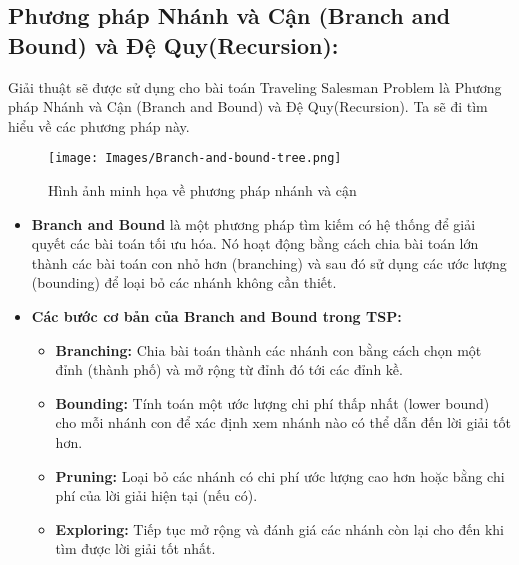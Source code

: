 \documentclass[a4paper]{article}
\begin{document}
\subsection{Phương pháp Nhánh và Cận (Branch and Bound) và Đệ Quy(Recursion): }\label{control}
Giải thuật sẽ được sử dụng cho bài toán Traveling Salesman Problem là Phương pháp Nhánh và Cận (Branch and Bound) và Đệ Quy(Recursion). Ta sẽ đi tìm hiểu về các phương pháp này.
\begin{figure}[h]
    \centering
    \texttt{[image: Images/Branch-and-bound-tree.png]}
    \caption{Hình ảnh minh họa về phương pháp nhánh và cận}
    \label{fig:tsp}
\end{figure}
\newpage
\begin{itemize}
\subsection*{Phương pháp Branch and Bound trong TSP}
    \item \textbf{Branch and Bound} là một phương pháp tìm kiếm có hệ thống để giải quyết các bài toán tối ưu hóa. Nó hoạt động bằng cách chia bài toán lớn thành các bài toán con nhỏ hơn (branching) và sau đó sử dụng các ước lượng (bounding) để loại bỏ các nhánh không cần thiết. \cite{beale1979branch}

    \item \textbf{Các bước cơ bản của Branch and Bound trong TSP:}

    \begin{itemize}
        \item \textbf{Branching:} Chia bài toán thành các nhánh con bằng cách chọn một đỉnh (thành phố) và mở rộng từ đỉnh đó tới các đỉnh kề.
        \item \textbf{Bounding:} Tính toán một ước lượng chi phí thấp nhất (lower bound) cho mỗi nhánh con để xác định xem nhánh nào có thể dẫn đến lời giải tốt hơn.
        \item \textbf{Pruning:} Loại bỏ các nhánh có chi phí ước lượng cao hơn hoặc bằng chi phí của lời giải hiện tại (nếu có).
        \item \textbf{Exploring:} Tiếp tục mở rộng và đánh giá các nhánh còn lại cho đến khi tìm được lời giải tốt nhất.
    \end{itemize}

\end{itemize}
\end{document}
